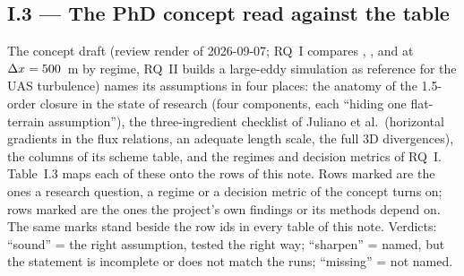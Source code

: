 \clearpage
\subsection*{I.3 --- The PhD concept read against the table}

The concept draft (review render of 2026-09-07; RQ~I compares \schemeM, \schemeG, \schemeA{} and
\schemeF{} at $\Delta x = 500$~m by regime, RQ~II builds a large-eddy simulation as reference for the UAS
turbulence) names its assumptions in four places: the anatomy of the 1.5-order closure in the state
of research (four components, each ``hiding one flat-terrain assumption''), the three-ingredient
checklist of Juliano et al.\ (horizontal gradients in the flux relations, an adequate length scale,
the full 3D divergences), the columns of its scheme table, and the regimes and decision metrics of
RQ~I. Table~I.3 maps each of these onto the rows of this note. Rows marked \kfull{} are the ones
a research question, a regime or a decision metric of the concept turns on; rows marked \khalf{}
are the ones the project's own findings or its methods depend on. The same marks stand beside the
row ids in every table of this note. Verdicts: ``sound'' = the right assumption, tested the right
way; ``sharpen'' = named, but the statement is incomplete or does not match the runs; ``missing'' =
not named.

